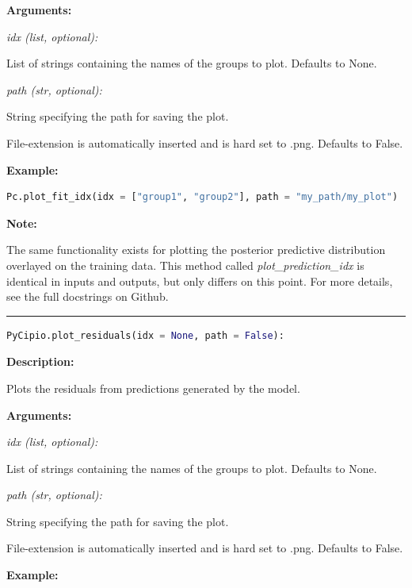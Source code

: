 \documentclass{article}
\begin{document}
\indent \textbf{Arguments:}

\indent \indent \textit{idx (list, optional):} 

\indent \indent \indent List of strings containing the names of the groups to plot. Defaults to None.

\indent \indent \textit{path (str, optional):}

\indent \indent \indent String specifying the path for saving the plot. 

\indent \indent \indent File-extension is automatically inserted and is hard set to .png. Defaults to False.

\indent \textbf{Example:}

\begin{lstlisting}[language=Python]
        Pc.plot_fit_idx(idx = ["group1", "group2"], path = "my_path/my_plot")
\end{lstlisting}

\noindent \textbf{Note:}

\noindent The same functionality exists for plotting the posterior predictive distribution overlayed on the training data. This method called \textit{plot\_prediction\_idx} is identical in inputs and outputs, but only differs on this point. For more details, see the full docstrings on Github. 


\hrule

\begin{lstlisting}[language=Python]
    PyCipio.plot_residuals(idx = None, path = False):
\end{lstlisting}

\indent \textbf{Description:} 

\indent \indent Plots the residuals from predictions generated by the model.

\indent \textbf{Arguments:}

\indent \indent \textit{idx (list, optional):}

\indent \indent \indent List of strings containing the names of the groups to plot. Defaults to None.

\indent \indent \textit{path (str, optional):}

\indent \indent \indent String specifying the path for saving the plot. 

\indent \indent \indent File-extension is automatically inserted and is hard set to .png. Defaults to False.

\indent \textbf{Example:}
\end{document}
